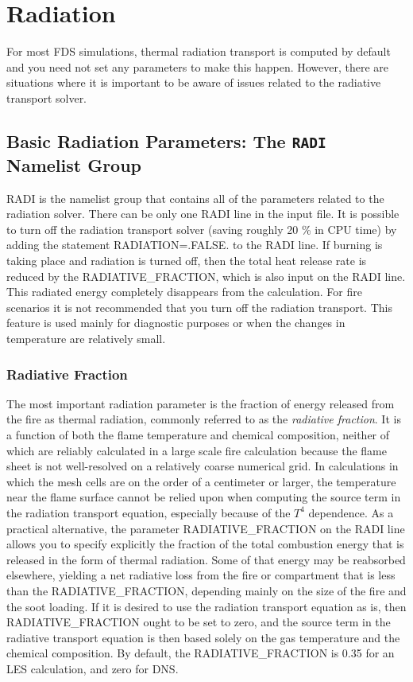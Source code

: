 \documentclass[11pt]{book}
\begin{document}
\chapter{Radiation}

For most FDS simulations, thermal radiation transport is computed by default and you need not set any
parameters to make this happen. However, there are situations where it is important to be aware of
issues related to the radiative transport solver.

\section{Basic Radiation Parameters: The \texorpdfstring{{\tt RADI}}{RADI} Namelist Group}
\label{info:RADI}

{\ct RADI} is the namelist group that contains all of the parameters related to the radiation solver. There can be only one
{\ct RADI} line in the input file. It is possible to turn off the radiation transport
solver (saving roughly 20 \% in CPU time) by adding the statement
{\ct RADIATION=.FALSE.} to the {\ct RADI} line.  If burning
is taking place and radiation is turned off, then the total heat
release rate is reduced by the {\ct RADIATIVE\_FRACTION}, which is
also input on the {\ct RADI} line. This radiated energy completely
disappears from the calculation. For fire scenarios it is not recommended that you turn off the
radiation transport. This feature is used mainly for diagnostic purposes or when the changes in
temperature are relatively small.

\subsection{Radiative Fraction}

The most important radiation parameter is the fraction of energy released from the
fire as thermal radiation, commonly referred to as the {\em radiative fraction}. It is a function of both the flame temperature
and chemical composition, neither of which are reliably calculated in a large
scale fire calculation because the flame sheet is not well-resolved on a relatively coarse numerical grid.
In calculations in which the mesh cells are on the order of a centimeter or
larger, the temperature near the flame surface cannot be relied upon when
computing the source term in the radiation transport equation, especially
because of the $T^4$ dependence.
As a practical alternative, the parameter {\ct RADIATIVE\_FRACTION} on the {\ct RADI} line allows you to specify explicitly the
fraction of the total combustion energy that is released in the form of thermal radiation.
Some of that energy may be reabsorbed elsewhere, yielding a net radiative
loss from the fire or compartment that is less than the {\ct RADIATIVE\_FRACTION}, depending mainly on the size of
the fire and the soot loading. If it is desired to use the radiation transport
equation as is, then {\ct RADIATIVE\_FRACTION} ought to be set to zero,
and the source term in the radiative transport equation is then based solely
on the gas temperature and the chemical composition. By default, the {\ct RADIATIVE\_FRACTION} is
0.35 for an LES calculation, and zero for DNS.
\end{document}
